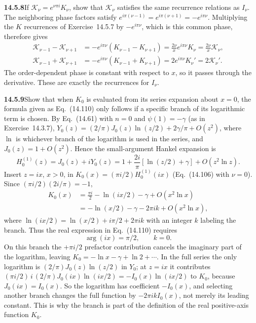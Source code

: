 \par\bigskip
\noindent\textbf{14.5.8}\quad If $\mathcal{K}_{\nu}=e^{\nu\pi i}K_{\nu}$,
show that $\mathcal{K}_{\nu}$ satisfies the same recurrence relations
as $I_{\nu}$.
\solution
The neighboring phase factors satisfy
$e^{i\pi(\nu-1)}=e^{i\pi(\nu+1)}=-e^{i\pi\nu}$.
Multiplying the $K$ recurrences of Exercise~14.5.7 by
$-e^{i\pi\nu}$, which is this common phase, therefore gives
\begin{align*}
\mathcal K_{\nu-1}-\mathcal K_{\nu+1}
&=-e^{i\pi\nu}(K_{\nu-1}-K_{\nu+1})
=\frac{2\nu}{x}e^{i\pi\nu}K_\nu
=\boxed{\frac{2\nu}{x}\mathcal K_\nu},\\
\mathcal K_{\nu-1}+\mathcal K_{\nu+1}
&=-e^{i\pi\nu}(K_{\nu-1}+K_{\nu+1})
=2e^{i\pi\nu}K_\nu'
=\boxed{2\mathcal K_\nu'}.
\end{align*}
The order-dependent phase is constant with respect to $x$, so it
passes through the derivative. These are exactly the recurrences
for $I_\nu$.

\par\bigskip
\noindent\textbf{14.5.9}\quad Show that when $K_{0}$ is evaluated from
its series expansion about $x=0$, the formula given as Eq.~(14.110)
only follows if a specific branch of its logarithmic term is chosen.
\solution
By Eq.~(14.61) with $n=0$ and $\psi(1)=-\gamma$ (as in
Exercise~14.3.7),
$Y_0(z)=(2/\pi)J_0(z)\ln(z/2)+2\gamma/\pi+O(z^2)$, where $\ln$ is
whichever branch of the logarithm is used in the series, and
$J_0(z)=1+O(z^2)$. Hence the small-argument Hankel expansion is
\[
H_0^{(1)}(z)=J_0(z)+iY_0(z)=1+\frac{2i}{\pi}[\ln(z/2)+\gamma]
+O(z^2\ln z).
\]
Insert $z=ix$, $x>0$, in $K_0(x)=(\pi i/2)H_0^{(1)}(ix)$
(Eq.~(14.106) with $\nu=0$). Since $(\pi i/2)(2i/\pi)=-1$,
\begin{align*}
K_0(x)&=\frac{\pi i}{2}-\ln(ix/2)-\gamma
+O(x^2\ln x)\\
&=-\ln(x/2)-\gamma-2\pi i k+O(x^2\ln x),
\end{align*}
where $\ln(ix/2)=\ln(x/2)+i\pi/2+2\pi ik$ with an integer $k$
labeling the branch. Thus the real expression in Eq.~(14.110)
requires
\[
\boxed{\arg(ix)=\pi/2,\qquad k=0}.
\]
On this branch the $+\pi i/2$ prefactor contribution cancels the
imaginary part of the logarithm, leaving
$K_0=-\ln x-\gamma+\ln2+\cdots$.
In the full series the only logarithm is
$(2/\pi)J_0(z)\ln(z/2)$ in $Y_0$; at $z=ix$ it contributes
$(\pi i/2)\,i\,(2/\pi)J_0(ix)\ln(ix/2)=-I_0(x)\ln(ix/2)$ to $K_0$,
because $J_0(ix)=I_0(x)$. So the logarithm has coefficient
$-I_0(x)$, and selecting another branch changes the full function
by $-2\pi ikI_0(x)$, not merely its leading constant. This is why
the branch is part of the definition of the real positive-axis
function $K_0$.

